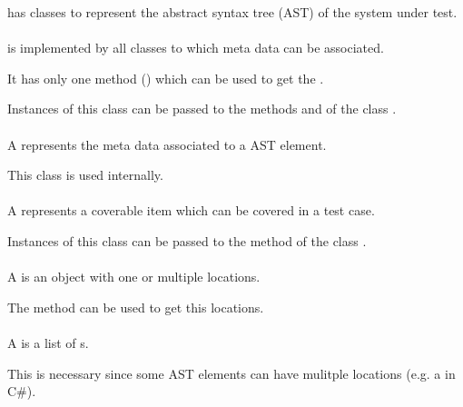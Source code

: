  has classes to represent the abstract syntax tree
(AST) of the system under test.

\paragraph{}

 is implemented by all classes to which meta data can be
associated.

It has only one method () which can be used to get the
.

Instances of this class can be passed to the methods
 and 
of the class .

\paragraph{}

A  represents the meta data associated to a AST element.

This class is used internally.

\paragraph{}

A  represents a coverable item which can be covered in
a test case.

Instances of this class can be passed to the method 
of the class .

\paragraph{}

A  is an object with one or multiple locations.

The method  can be used to get this locations.

\paragraph{}

A  is a list of s.

This is necessary since some AST elements can have mulitple locations
(e.g. a  in C\#).


